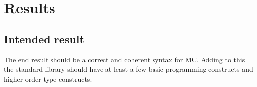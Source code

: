 \section{Results}
\subsection{Intended result}
The end result should be a correct and coherent syntax for MC.
Adding to this the standard library should have at least a few basic programming constructs and higher order type constructs.





\begin{appendices}
   
\end{appendices}

